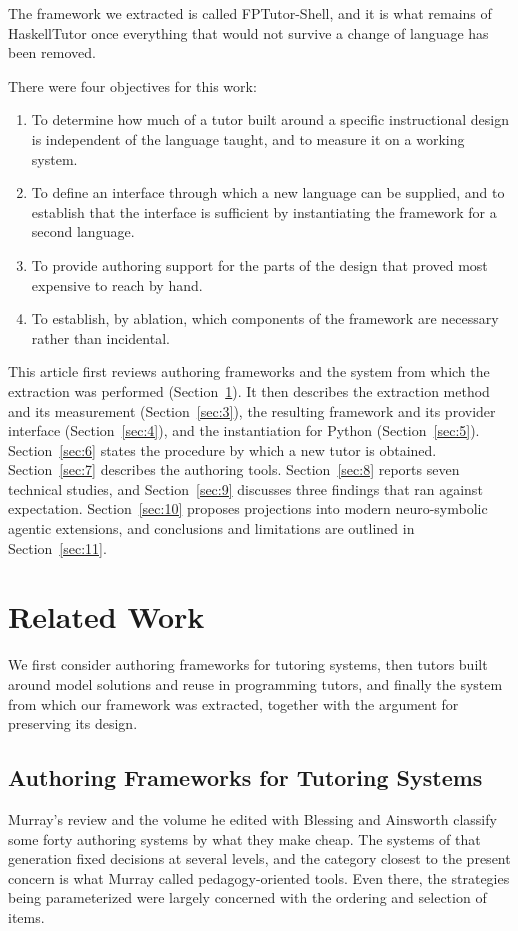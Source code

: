 \documentclass[journal]{IEEEtran}
\providecommand{\tightlist}{\setlength{\itemsep}{0pt}\setlength{\parskip}{0pt}}
\begin{document}
The framework we extracted is called FPTutor-Shell, and it is what
remains of HaskellTutor once everything that would not survive a change
of language has been removed.

There were four objectives for this work:
\begin{enumerate}
\def\labelenumi{\arabic{enumi}.}
\tightlist
\item
  To determine how much of a tutor built around a specific instructional
  design is independent of the language taught, and to measure it on a
  working system.
\item
  To define an interface through which a new language can be supplied,
  and to establish that the interface is sufficient by instantiating the
  framework for a second language.
\item
  To provide authoring support for the parts of the design that proved
  most expensive to reach by hand.
\item
  To establish, by ablation, which components of the framework are
  necessary rather than incidental.
\end{enumerate}

This article first reviews authoring frameworks and the system from
which the extraction was performed (Section~\ref{sec:2}). It then describes the
extraction method and its measurement (Section~\ref{sec:3}), the resulting
framework and its provider interface (Section~\ref{sec:4}), and the instantiation
for Python (Section~\ref{sec:5}). Section~\ref{sec:6} states the procedure by which a new
tutor is obtained. Section~\ref{sec:7} describes the authoring tools. Section~\ref{sec:8}
reports seven technical studies, and Section~\ref{sec:9} discusses three findings
that ran against expectation. Section~\ref{sec:10} proposes projections into modern neuro-symbolic agentic extensions, and conclusions and limitations are outlined in Section~\ref{sec:11}.

\section{Related Work}\label{sec:2}
We first consider authoring frameworks for tutoring systems, then tutors
built around model solutions and reuse in programming tutors, and finally
the system from which our framework was extracted, together with the
argument for preserving its design.

\subsection{Authoring Frameworks for Tutoring Systems}\label{sec:2.1}
Murray's review \cite{b2} and the volume he edited with Blessing and
Ainsworth \cite{b3} classify some forty authoring systems by what they
make cheap. The systems of that generation fixed decisions at several
levels, and the category closest to the present concern is what Murray
called pedagogy-oriented tools. Even there, the strategies being
parameterized were largely concerned with the ordering and selection of
items.
\end{document}
